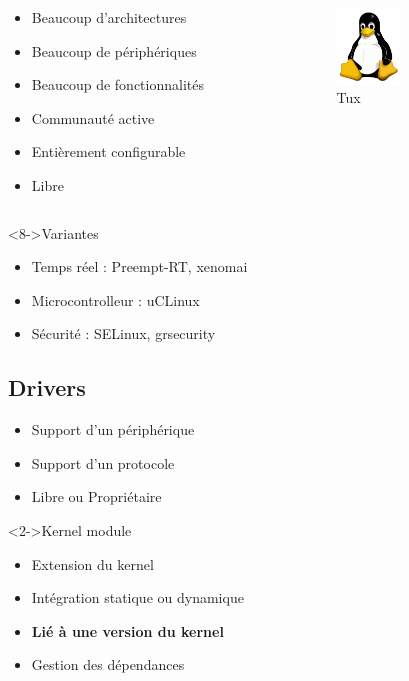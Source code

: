 \begin{frame}
	\begin{columns}[t]
		\begin{column}{0.70\textwidth}
			\begin{itemize}
				\item<2-> Beaucoup d'architectures
				\item<3-> Beaucoup de périphériques
				\item<4-> Beaucoup de fonctionnalités
				\item<5-> Communauté active
				\item<6-> Entièrement configurable
				\item<7-> Libre
			\end{itemize}
		\end{column}
		\begin{column}{0.25\textwidth}
			\begin{figure}
				\includegraphics[height=2cm]{img/tux.png}
				\caption{Tux}
			\end{figure}
		\end{column}
	\end{columns}
	\begin{block}<8->{Variantes}
		\begin{itemize}
			\item<8-> Temps réel : Preempt-RT, xenomai
			\item<9-> Microcontrolleur : uCLinux
			\item<10-> Sécurité : SELinux, grsecurity
		\end{itemize}
	\end{block}
\end{frame}
\subsection{Drivers}
\begin{frame}
	\begin{itemize}
		\item Support d'un périphérique
		\item Support d'un protocole
		\item Libre ou Propriétaire
	\end{itemize}
	\begin{block}<2->{Kernel module}
		\begin{itemize}
		\item Extension du kernel
		\item Intégration statique ou dynamique
		\item \textbf{Lié à une version du kernel}
		\item Gestion des dépendances
		\end{itemize}
	\end{block}
\end{frame}
